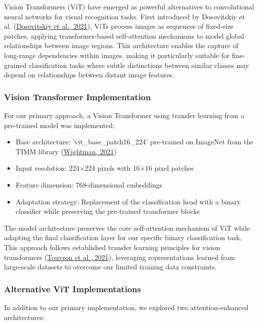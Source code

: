 \documentclass[a4paper,12pt]{article}
\begin{document}
Vision Transformers (ViT) have emerged as powerful alternatives to convolutional neural networks for visual recognition tasks. First introduced by Dosovitskiy et al. (\href{https://arxiv.org/abs/2010.11929}{Dosovitskiy et al., 2021}), ViTs process images as sequences of fixed-size patches, applying transformer-based self-attention mechanisms to model global relationships between image regions. This architecture enables the capture of long-range dependencies within images, making it particularly suitable for fine-grained classification tasks where subtle distinctions between similar classes may depend on relationships between distant image features.

\subsubsection{Vision Transformer Implementation}

For our primary approach, a Vision Transformer using transfer learning from a pre-trained model was implemented:

\begin{itemize}
    \item Base architecture: 'vit\_base\_patch16\_224' pre-trained on ImageNet from the TIMM library (\href{https://github.com/rwightman/pytorch-image-models}{Wightman, 2021})
    \item Input resolution: 224×224 pixels with 16×16 pixel patches
    \item Feature dimension: 768-dimensional embeddings
    \item Adaptation strategy: Replacement of the classification head with a binary classifier while preserving the pre-trained transformer blocks
\end{itemize}

The model architecture preserves the core self-attention mechanism of ViT while adapting the final classification layer for our specific binary classification task. This approach follows established transfer learning principles for vision transformers (\href{https://arxiv.org/abs/2012.12877}{Touvron et al., 2021}), leveraging representations learned from large-scale datasets to overcome our limited training data constraints.

\subsubsection{Alternative ViT Implementations}

In addition to our primary implementation, we explored two attention-enhanced architectures:
\end{document}
